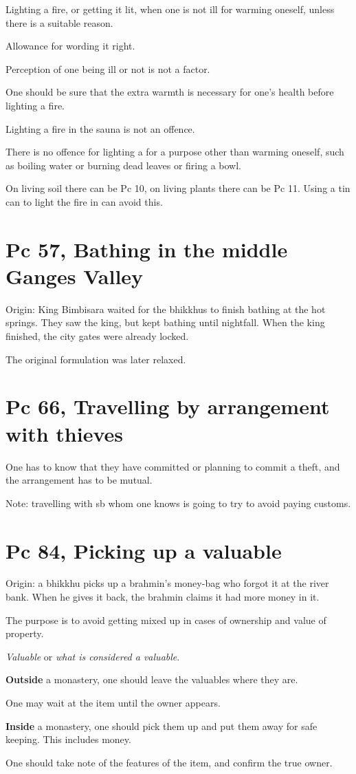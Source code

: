 \begin{multicols}{2}

Lighting a fire, or getting it lit, when one is not ill for warming
oneself, unless there is a suitable reason.

Allowance for wording it right.

Perception of one being ill or not is not a factor.

One should be sure that the extra warmth is necessary for one's health
before lighting a fire.

Lighting a fire in the sauna is not an offence.

There is no offence for lighting a for a purpose other than warming
oneself, such as boiling water or burning dead leaves or firing a bowl.

On living soil there can be Pc 10, on living plants there can be Pc 11.
Using a tin can to light the fire in can avoid this.

\end{multicols}

\section{Pc 57, Bathing in the middle Ganges Valley}

Origin: King Bimbisara waited for the bhikkhus to finish bathing at the
hot springs. They saw the king, but kept bathing until nightfall. When
the king finished, the city gates were already locked.

The original formulation was later relaxed.

\section{Pc 66, Travelling by arrangement with thieves}

One has to know that they have committed or planning to commit a theft,
and the arrangement has to be mutual.

Note: travelling with sb whom one knows is going to try to avoid paying
customs.

\section{Pc 84, Picking up a valuable}

Origin: a bhikkhu picks up a brahmin's money-bag who forgot it at the
river bank. When he gives it back, the brahmin claims it had more money
in it.

The purpose is to avoid getting mixed up in cases of ownership and value
of property.

\emph{Valuable} or \emph{what is considered a valuable}.

\textbf{Outside} a monastery, one should leave the valuables where they
are.

One may wait at the item until the owner appears.

\textbf{Inside} a monastery, one should pick them up and put them away
for safe keeping. This includes money.

One should take note of the features of the item, and confirm the true
owner.

